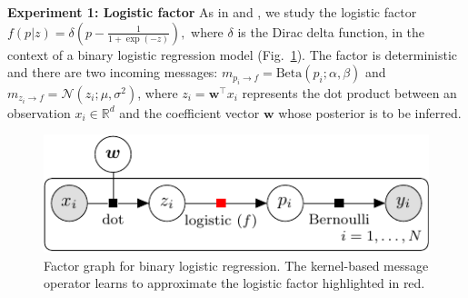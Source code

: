 \documentclass[english]{article}
\theoremstyle{plain}
\theoremstyle{plain}
\newcommand{\factor}{f}				%
\newcommand{\msg}[2]{m_{#1 \rightarrow #2}}			%
\newcommand{\figref}[1]{Fig.~\ref{#1}}
\begin{document}
\textbf{Experiment 1: Logistic factor}
As in \citet{Heess2013} and \citet{Eslami2014}, we study the logistic factor 
$\factor(p|z)=\delta\left(p-\frac{1}{1+\exp(-z)}\right),$ 
%
%
where $\delta$ is the Dirac delta function, in the context of 
a binary logistic regression model  (\figref{fig:factor_graph_binlog}).
The factor is deterministic and there are two incoming messages: 
$\msg{p_i}{\factor} = \text{Beta}(p_i; \alpha, \beta) $ and 
$\msg{z_i}{\factor} = \mathcal{N}(z_i; \mu, \sigma^2)$, 
where $z_i = \boldsymbol{w}^\top x_i$ represents the dot product between an observation 
$x_i \in \mathbb{R}^d$ and the coefficient vector $\boldsymbol{w}$ whose posterior is 
to be inferred.


\begin{figure}[ht]
\centering
\includegraphics[width=0.8\columnwidth]{binary_logistic_regression-crop}
%  
%  
\caption{Factor graph for binary logistic regression. 
The kernel-based message operator learns to approximate the logistic factor 
highlighted in red. 
}
\label{fig:factor_graph_binlog}
\end{figure}
\end{document}

